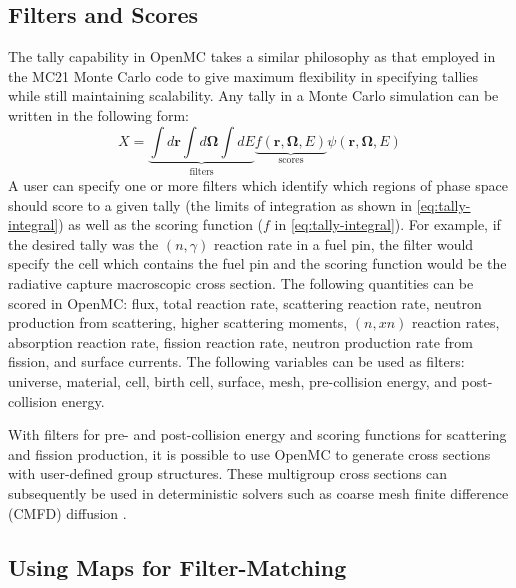 \subsection{Filters and Scores}
\label{sec:filters}

The tally capability in OpenMC takes a similar philosophy as that employed in
the MC21 Monte Carlo code \cite{mc-sutton-2007} to give maximum flexibility in
specifying tallies while still maintaining scalability. Any tally in a Monte
Carlo simulation can be written in the following form:
\begin{equation}
  \label{eq:tally-integral}
  X = \underbrace{\int d\mathbf{r} \int d\mathbf{\Omega} \int
    dE}_{\text{filters}} \underbrace{f(\mathbf{r}, \mathbf{\Omega},
    E)}_{\text{scores}} \psi (\mathbf{r}, \mathbf{\Omega}, E)
\end{equation}
A user can specify one or more filters which identify which regions of phase
space should score to a given tally (the limits of integration as shown in
\eqref{eq:tally-integral}) as well as the scoring function ($f$ in
\eqref{eq:tally-integral}). For example, if the desired tally was the
$(n,\gamma)$ reaction rate in a fuel pin, the filter would specify the cell
which contains the fuel pin and the scoring function would be the radiative
capture macroscopic cross section. The following quantities can be scored in
OpenMC: flux, total reaction rate, scattering reaction rate, neutron production
from scattering, higher scattering moments, $(n,xn)$ reaction rates, absorption
reaction rate, fission reaction rate, neutron production rate from fission, and
surface currents. The following variables can be used as filters: universe,
material, cell, birth cell, surface, mesh, pre-collision energy, and
post-collision energy.

With filters for pre- and post-collision energy and scoring functions for
scattering and fission production, it is possible to use OpenMC to generate
cross sections with user-defined group structures. These multigroup cross
sections can subsequently be used in deterministic solvers such as coarse mesh
finite difference (CMFD) diffusion \cite{physor-lee-2010}.

\subsection{Using Maps for Filter-Matching}

